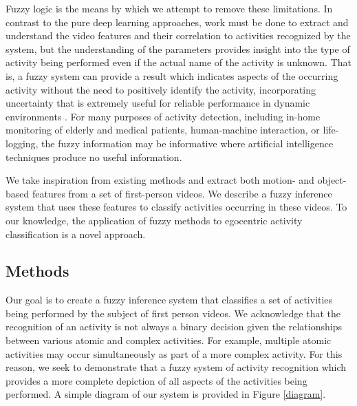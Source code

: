 \documentclass[12pt]{report}
\begin{document}
Fuzzy logic is the means by which we attempt to remove these limitations. In contrast to the pure deep learning approaches, work must be done to extract and understand the video features and their correlation to activities recognized by the system, but the understanding of the parameters provides insight into the type of activity being performed even if the actual name of the activity is unknown. That is, a fuzzy system can provide a result which indicates aspects of the occurring activity without the need to positively identify the activity, incorporating uncertainty that is extremely useful for reliable performance in dynamic environments \cite{Anderson2009}. For many purposes of activity detection, including in-home monitoring of elderly \cite{Banerjee2015, Anderson2009a} and medical patients, human-machine interaction, or life-logging, the fuzzy information may be informative where artificial intelligence techniques produce no useful information.

We take inspiration from existing methods and extract both motion- and object-based features from a set of first-person videos. We describe a fuzzy inference system that uses these features to classify activities occurring in these videos. To our knowledge, the application of fuzzy methods to egocentric activity classification is a novel approach.


\subsection{Methods}
Our goal is to create a fuzzy inference system that classifies a set of activities being performed by the subject of first person videos. We acknowledge that the recognition of an activity is not always a binary decision given the relationships between various atomic and complex activities. For example, multiple atomic activities may occur simultaneously as part of a more complex activity. For this reason, we seek to demonstrate that a fuzzy system of activity recognition which provides a more complete depiction of all aspects of the activities being performed. A simple diagram of our system is provided in Figure \ref{diagram}.
\end{document}
